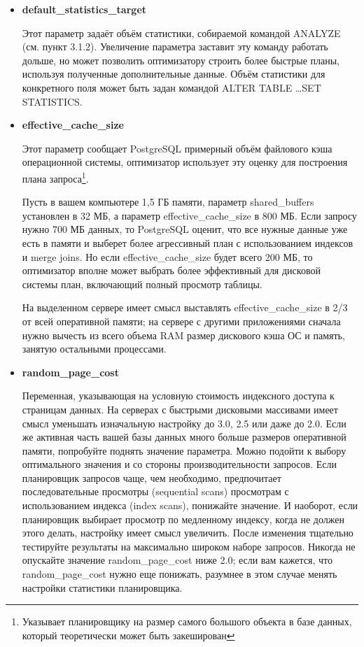 \begin{itemize}
\item \textbf{default\_statistics\_target} 

Этот параметр задаёт объём статистики, собираемой командой ANALYZE (см. пункт 3.1.2). 
Увеличение параметра заставит эту команду работать дольше, но может позволить оптимизатору строить более быстрые планы, 
используя полученные дополнительные данные. Объём статистики для конкретного поля может быть задан командой 
ALTER TABLE \dots SET STATISTICS.

\item \textbf{effective\_cache\_size}

Этот параметр сообщает PostgreSQL примерный объём файлового кэша операционной системы, оптимизатор использует эту оценку для 
построения плана запроса\footnote{Указывает планировщику на размер самого большого объекта в базе данных, который 
теоретически может быть закеширован}.

Пусть в вашем компьютере 1,5 ГБ памяти, параметр shared\_buffers установлен в 32 МБ, а параметр effective\_cache\_size в 800 МБ. 
Если запросу нужно 700 МБ данных, то PostgreSQL оценит, что все нужные данные уже есть в памяти и выберет более агрессивный план с 
использованием индексов и merge joins. Но если effective\_cache\_size будет всего 200 МБ, то оптимизатор вполне может выбрать более 
эффективный для дисковой системы план, включающий полный просмотр таблицы.

На выделенном сервере имеет смысл выставлять effective\_cache\_size в 2/3 от всей оперативной памяти; на сервере с 
другими приложениями сначала нужно вычесть из всего объема RAM размер дискового кэша ОС и память, 
занятую остальными процессами.

\item \textbf{random\_page\_cost} 

Переменная, указывающая на условную стоимость индексного доступа к страницам данных. На серверах с быстрыми дисковыми 
массивами имеет смысл уменьшать изначальную настройку до 3.0, 2.5 или даже до 2.0. Если же активная часть вашей базы данных 
много больше размеров оперативной памяти, попробуйте поднять значение параметра. Можно подойти к выбору оптимального значения 
и со стороны производительности запросов. Если планировщик запросов чаще, чем необходимо, предпочитает последовательные просмотры 
(sequential scans) просмотрам с использованием индекса (index scans), понижайте значение. И наоборот, если планировщик выбирает 
просмотр по медленному индексу, когда не должен этого делать, настройку имеет смысл увеличить. После изменения тщательно тестируйте 
результаты на максимально широком наборе запросов. Никогда не опускайте значение random\_page\_cost ниже 2.0; если вам кажется, 
что random\_page\_cost нужно еще понижать, разумнее в этом случае менять настройки статистики планировщика. 
\end{itemize}

